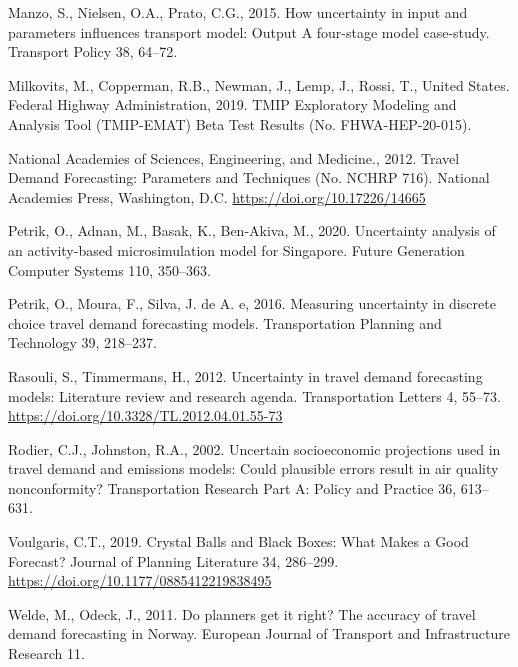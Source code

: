 \documentclass[
  futuretransp,
  submit,
  moreauthors,
]{Definitions/mdpi}
\newlength{\cslhangindent}
\newenvironment{CSLReferences}[2] %
 {\begin{list}{}{%
  \setlength{\itemindent}{0pt}
  \setlength{\leftmargin}{0pt}
  \setlength{\parsep}{0pt}
  \ifodd #1
   \setlength{\leftmargin}{\cslhangindent}
   \setlength{\itemindent}{-1\cslhangindent}
  \fi
  \setlength{\itemsep}{#2\baselineskip}}}
 {\end{list}}
\begin{document}
\begin{CSLReferences}{1}{0}
Manzo, S., Nielsen, O.A., Prato, C.G., 2015. How uncertainty in input
and parameters influences transport model: Output {A} four-stage model
case-study. Transport Policy 38, 64--72.

Milkovits, M., Copperman, R.B., Newman, J., Lemp, J., Rossi, T., United
States. Federal Highway Administration, 2019. {TMIP Exploratory
Modeling} and {Analysis Tool} ({TMIP-EMAT}) {Beta Test Results} (No.
FHWA-HEP-20-015).

National Academies of Sciences, Engineering, and Medicine., 2012. Travel
{Demand Forecasting}: {Parameters} and {Techniques} (No. NCHRP 716).
National Academies Press, Washington, D.C.
\url{https://doi.org/10.17226/14665}

Petrik, O., Adnan, M., Basak, K., Ben-Akiva, M., 2020. Uncertainty
analysis of an activity-based microsimulation model for {Singapore}.
Future Generation Computer Systems 110, 350--363.

Petrik, O., Moura, F., Silva, J. de A. e, 2016. Measuring uncertainty in
discrete choice travel demand forecasting models. Transportation
Planning and Technology 39, 218--237.

Rasouli, S., Timmermans, H., 2012. Uncertainty in travel demand
forecasting models: Literature review and research agenda.
Transportation Letters 4, 55--73.
\url{https://doi.org/10.3328/TL.2012.04.01.55-73}

Rodier, C.J., Johnston, R.A., 2002. Uncertain socioeconomic projections
used in travel demand and emissions models: Could plausible errors
result in air quality nonconformity? Transportation Research Part A:
Policy and Practice 36, 613--631.

Voulgaris, C.T., 2019. Crystal {Balls} and {Black Boxes}: {What Makes} a
{Good Forecast}? Journal of Planning Literature 34, 286--299.
\url{https://doi.org/10.1177/0885412219838495}

Welde, M., Odeck, J., 2011. Do planners get it right? {The} accuracy of
travel demand forecasting in {Norway}. European Journal of Transport and
Infrastructure Research 11.


\end{CSLReferences}
\end{document}
